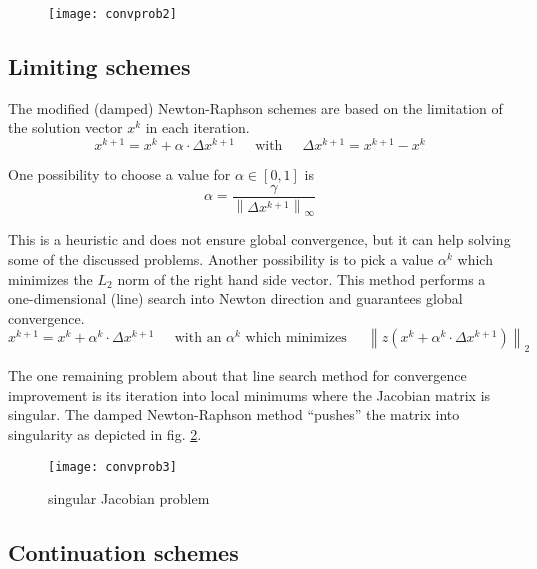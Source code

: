 \begin{figure}[ht]
\begin{center}
\texttt{[image: convprob2]}
\end{center}
\label{fig:ConvProb2}
\end{figure}
\FloatBarrier

\subsection{Limiting schemes}

The modified (damped) Newton-Raphson schemes are based on the
limitation of the solution vector $x^k$ in each iteration.
\begin{equation}
x^{k+1} = x^k + \alpha\cdot \Delta x^{k+1}
\;\;\;\; \textrm{ with } \;\;\;\;
\Delta x^{k+1} = x^{k+1} - x^k
\end{equation}

One possibility to choose a value for $\alpha \in [0,1]$ is
\begin{equation}
\alpha = \dfrac{\gamma}{\left\lVert\Delta x^{k+1}\right\rVert_{\infty}}
\end{equation}

This is a heuristic and does not ensure global convergence, but it can
help solving some of the discussed problems.  Another possibility is
to pick a value $\alpha^k$ which minimizes the $L_2$ norm of the right
hand side vector.  This method performs a one-dimensional (line)
search into Newton direction and guarantees global convergence.
\begin{equation}
x^{k+1} = x^k + \alpha^k \cdot \Delta x^{k+1}
\;\;\;\; \textrm{ with an } \alpha^k \textrm{ which minimizes } \;\;\;\;
\left\lVert z\left(x^k + \alpha^k \cdot \Delta x^{k+1}\right)\right\rVert_2
\end{equation}

The one remaining problem about that line search method for
convergence improvement is its iteration into local minimums where the
Jacobian matrix is singular.  The damped Newton-Raphson method
``pushes'' the matrix into singularity as depicted in
fig. \ref{fig:ConvProb3}.
\begin{figure}[ht]
\centering
\texttt{[image: convprob3]}
\caption{singular Jacobian problem}
\label{fig:ConvProb3}
\end{figure}
\FloatBarrier

\subsection{Continuation schemes}
\label{sec:continuation}


